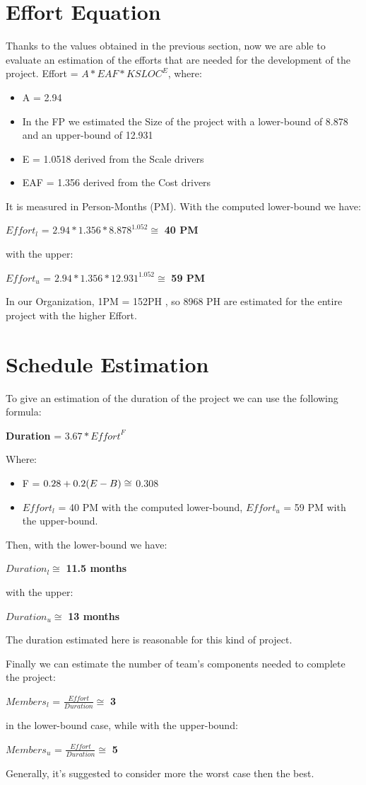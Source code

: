 \section{Effort Equation}
Thanks to the values obtained in the previous section, now we are able to evaluate an estimation of the efforts that are needed for the development of the project.  Effort = $A * EAF * KSLOC^E $, where:  
\begin{itemize}
\item A = 2.94 
\item In the FP we estimated the Size of the project with a lower-bound of 8.878 and an upper-bound of 12.931
\item E = 1.0518 derived from the Scale drivers
\item EAF = 1.356 derived from the Cost drivers
\end{itemize}
It is measured in Person-Months (PM).
With the computed lower-bound we have: 
\\\begin{center} $Effort_l$ = $ 2.94 * 1.356 * 8.878^{1.052} \cong$ \textbf{40 PM}\end{center}
with the upper:
\\\begin{center} $Effort_u$ = $2.94 * 1.356 * 12.931^{1.052} \cong$ \textbf{59 PM} \end{center}

In our Organization, 1PM = 152PH , so 8968 PH are estimated for the entire project with the higher Effort.

\section{Schedule Estimation}
To give an estimation of the duration of the project we can use the following formula:
\begin{center}\textbf{Duration} = $3.67 * \textit{Effort}^F$  \end{center}
Where:
\begin{itemize}
\item F = $0.28 + 0.2 \* (E - B) \cong$  0.308
\item $Effort_l$ = 40 PM with the computed lower-bound, $Effort_u$ = 59 PM with the upper-bound.
\end{itemize}
Then, with the lower-bound we have: 
\begin{center}$Duration_l \cong$ \textbf{11.5 months} \end{center}
with the upper:
\begin{center}$Duration_u \cong$ \textbf{13 months} \end{center}
The duration estimated here is reasonable for this kind of project.

Finally we can estimate the number of team's components needed to complete the project:
\begin{center}\textbf{$Members_l$} = $\frac{Effort}{Duration} \cong$ \textbf{3}\end{center}
in the lower-bound case, while with the upper-bound:
\begin{center}\textbf{$Members_u$} = $\frac{Effort}{Duration} \cong$ \textbf{5}\end{center}
Generally, it's suggested to consider more the worst case then the best.
